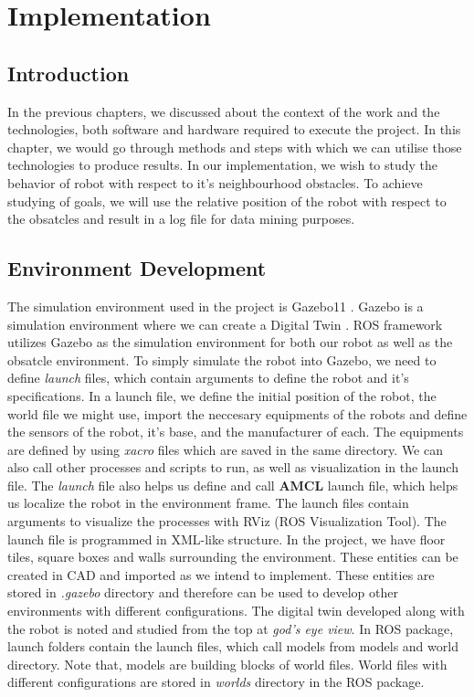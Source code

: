 
\chapter{Implementation} %

\label{Chapter3} %

\section{Introduction}
In the previous chapters, we discussed about the context of the work and the technologies, both software and hardware required to execute the project. In this chapter, we would go through methods and steps 
with which we can utilise those technologies to produce results. In our implementation, we wish to study the behavior of robot with respect to it's neighbourhood obstacles. To achieve studying of goals, we will use the relative position of the robot
with respect to the obsatcles and result in a log file for data mining purposes.

\section{Environment Development}
The simulation environment used in the project is Gazebo11 \cite{1389727}. Gazebo is a simulation environment where we can create a Digital Twin \cite{8901113}. ROS framework utilizes Gazebo as 
the simulation environment for both our robot as well as the obsatcle environment. To simply simulate the robot into Gazebo, we need to define \textit{launch} files, which contain arguments to define the robot and it's specifications.
In a launch file, we define the initial position of the robot, the world file we might use, import the neccesary equipments of the robots and define the sensors of the robot, it's base, and the manufacturer of each.
The equipments are defined by using \textit{xacro} files which are saved in the same directory. We can also call other processes and scripts to run, as well as visualization in the launch file. The \textit{launch} file also helps us define and call \textbf{AMCL} launch file,
which helps us localize the robot in the environment frame. The launch files contain arguments to visualize the processes with RViz (ROS Visualization Tool). The launch file is programmed in XML-like structure.
In the project, we have floor tiles, square boxes and walls surrounding the environment. These entities can be created in CAD and imported as we intend to implement. These entities are stored in \textit{.gazebo} directory 
and therefore can be used to develop other environments with different configurations. The digital twin developed along with the robot is noted and studied from the top at \textit{god's eye view}.
In ROS package, launch folders contain the launch files, which call models from models and world directory. Note that, models are building blocks of world files. World files with different configurations are stored in \textit{worlds} directory in the ROS package.

